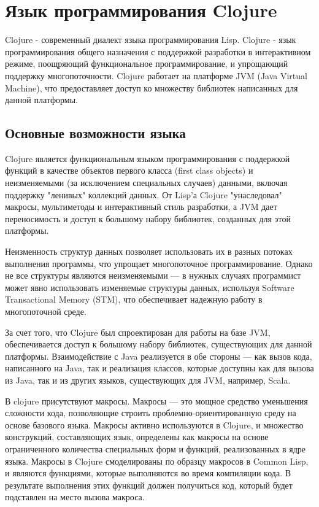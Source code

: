 \section{Язык программирования Clojure}

Clojure \cite{clojure} - современный диалект языка программирования Lisp. Clojure - язык программирования общего назначения с поддержкой разработки в интерактивном режиме, поощряющий функциональное программирование, и упрощающий поддержку многопоточности. Clojure работает на платформе JVM (Java Virtual Machine), что предоставляет доступ ко множеству библиотек написанных для данной платформы.

\subsection{Основные возможности языка}

Clojure является функциональным языком программирования с поддержкой функций в качестве объектов первого класса (first class objects) и неизменяемыми (за исключением специальных случаев) данными, включая поддержку "ленивых" коллекций данных. От Lisp'а Clojure "унаследовал" макросы, мультиметоды и интерактивный стиль разработки, а JVM дает переносимость и доступ к большому набору библиотек, созданных для этой платформы.

Неизменность структур данных позволяет использовать их в разных потоках выполнения программы, что упрощает многопоточное программирование. Однако не все структуры являются неизменяемыми — в нужных случаях программист может явно использовать изменяемые структуры данных, используя Software Transactional Memory (STM), что обеспечивает надежную работу в многопоточной среде.

За счет того, что Clojure был спроектирован для работы на базе JVM, обеспечивается доступ к большому набору библиотек, существующих для данной платформы. Взаимодействие с Java реализуется в обе стороны — как вызов кода, написанного на Java, так и реализация классов, которые доступны как для вызова из Java, так и из других языков, существующих для JVM, например, Scala.

В clojure присутствуют макросы. Макросы — это мощное средство уменьшения сложности кода, позволяющие строить проблемно-ориентированную среду на основе базового языка. Макросы активно используются в Clojure, и множество конструкций, составляющих язык, определены как макросы на основе ограниченного количества специальных форм и функций, реализованных в ядре языка. Макросы в Clojure смоделированы по образцу макросов в Common Lisp, и являются функциями, которые выполняются во время компиляции кода. В результате выполнения этих функций должен получиться код, который будет подставлен на место вызова макроса.

